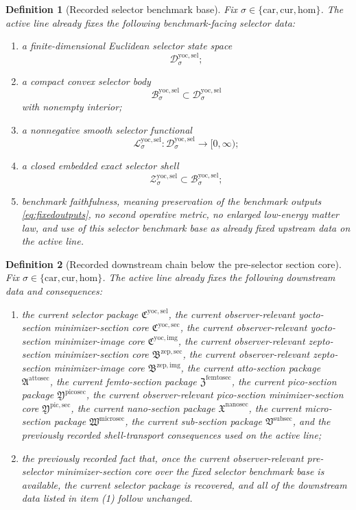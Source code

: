 \documentclass[11pt]{article}
\newcommand{\Car}{\mathrm{car}}
\newcommand{\Cur}{\mathrm{cur}}
\newcommand{\Hom}{\mathrm{hom}}
\newcommand{\SubSectionPackage}{\mathfrak V^{\mathrm{subsec}}}
\newcommand{\MicroSectionPackage}{\mathfrak W^{\mathrm{microsec}}}
\newcommand{\NanoSectionPackage}{\mathfrak X^{\mathrm{nanosec}}}
\newcommand{\PicoSectionPackage}{\mathfrak Y^{\mathrm{picosec}}}
\newcommand{\PicoMinSectionCore}{\mathfrak Y^{\mathrm{pic,sec}}}
\newcommand{\FemtoSectionPackage}{\mathfrak Z^{\mathrm{femtosec}}}
\newcommand{\AttoSectionPackage}{\mathfrak A^{\mathrm{attosec}}}
\newcommand{\ZeptoImageCore}{\mathfrak B^{\mathrm{zep,img}}}
\newcommand{\ZeptoMinSectionCore}{\mathfrak B^{\mathrm{zep,sec}}}
\newcommand{\YoctoImageCore}{\mathfrak C^{\mathrm{yoc,img}}}
\newcommand{\YoctoMinSectionCore}{\mathfrak C^{\mathrm{yoc,sec}}}
\newcommand{\YoctoSelectorPackage}{\mathfrak C^{\mathrm{yoc,sel}}}
\newcommand{\YoctoSelectorSpace}[1]{\mathcal D_{#1}^{\mathrm{yoc,sel}}}
\newcommand{\YoctoSelectorBody}[1]{\mathcal B_{#1}^{\mathrm{yoc,sel}}}
\newcommand{\YoctoSelectorFunctional}[1]{\mathscr L_{#1}^{\mathrm{yoc,sel}}}
\newcommand{\YoctoSelectorShell}[1]{\mathcal Z_{#1}^{\mathrm{yoc,sel}}}
\newtheorem{definition}{Definition}
\begin{document}
\begin{definition}[Recorded selector benchmark base]
\label{def:selectorbase}
Fix \(\sigma\in\{\Car,\Cur,\Hom\}\). The active line already fixes the following benchmark-facing selector data:
\begin{enumerate}
    \item a finite-dimensional Euclidean selector state space
    \[
    \YoctoSelectorSpace{\sigma};
    \]
    \item a compact convex selector body
    \[
    \YoctoSelectorBody{\sigma}\subset\YoctoSelectorSpace{\sigma}
    \]
    with nonempty interior;
    \item a nonnegative smooth selector functional
    \[
    \YoctoSelectorFunctional{\sigma}:\YoctoSelectorSpace{\sigma}\to[0,\infty);
    \]
    \item a closed embedded exact selector shell
    \[
    \YoctoSelectorShell{\sigma}\subset\YoctoSelectorBody{\sigma};
    \]
    \item benchmark faithfulness, meaning preservation of the benchmark outputs \eqref{eq:fixedoutputs}, no second operative metric, no enlarged low-energy matter law, and use of this selector benchmark base as already fixed upstream data on the active line.
\end{enumerate}
\end{definition}

\begin{definition}[Recorded downstream chain below the pre-selector section core]
\label{def:downstream}
Fix \(\sigma\in\{\Car,\Cur,\Hom\}\). The active line already fixes the following downstream data and consequences:
\begin{enumerate}
    \item the current selector package \(\YoctoSelectorPackage\), the current observer-relevant yocto-section minimizer-section core \(\YoctoMinSectionCore\), the current observer-relevant yocto-section minimizer-image core \(\YoctoImageCore\), the current observer-relevant zepto-section minimizer-section core \(\ZeptoMinSectionCore\), the current observer-relevant zepto-section minimizer-image core \(\ZeptoImageCore\), the current atto-section package \(\AttoSectionPackage\), the current femto-section package \(\FemtoSectionPackage\), the current pico-section package \(\PicoSectionPackage\), the current observer-relevant pico-section minimizer-section core \(\PicoMinSectionCore\), the current nano-section package \(\NanoSectionPackage\), the current micro-section package \(\MicroSectionPackage\), the current sub-section package \(\SubSectionPackage\), and the previously recorded shell-transport consequences used on the active line;
    \item the previously recorded fact that, once the current observer-relevant pre-selector minimizer-section core over the fixed selector benchmark base is available, the current selector package is recovered, and all of the downstream data listed in item (1) follow unchanged.
\end{enumerate}
\end{definition}
\end{document}
